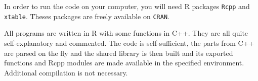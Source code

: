 \documentclass[a4paper,12pt]{article}
\begin{document}
In order to run the code on your computer, you will need R packages \verb|Rcpp| and \verb|xtable|. Theses packages are freely available on \verb|CRAN|.
\vspace{0.2cm}

All programs are written in R with some functions in C++. They are all quite self-explanatory and commented. The code is self-sufficient, the parts from C++ are parsed on the fly and the shared library is then built and its exported functions and Rcpp modules are made available in the specified environment. Additional compilation is not necessary. 
\end{document}
